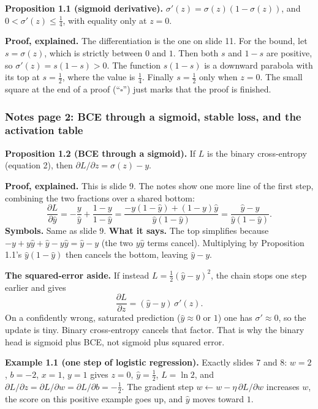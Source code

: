 \textbf{Proposition 1.1 (sigmoid derivative).} $\sigma'(z)=\sigma(z)(1-\sigma(z))$, and $0<\sigma'(z)\le\tfrac14$, with equality only at $z=0$.

\textbf{Proof, explained.} The differentiation is the one on slide 11. For the bound, let $s=\sigma(z)$, which is strictly between $0$ and $1$. Then both $s$ and $1-s$ are positive, so $\sigma'(z)=s(1-s)>0$. The function $s(1-s)$ is a downward parabola with its top at $s=\tfrac12$, where the value is $\tfrac14$. Finally $s=\tfrac12$ only when $z=0$. The small square at the end of a proof (``$\square$'') just marks that the proof is finished.

\subsubsection{Notes page 2: BCE through a sigmoid, stable loss, and the activation table}

\textbf{Proposition 1.2 (BCE through a sigmoid).} If $L$ is the binary cross-entropy (equation 2), then $\partial L/\partial z=\sigma(z)-y$.

\textbf{Proof, explained.} This is slide 9. The notes show one more line of the first step, combining the two fractions over a shared bottom:
\[
\frac{\partial L}{\partial\hat{y}}=-\frac{y}{\hat{y}}+\frac{1-y}{1-\hat{y}}=\frac{-y(1-\hat{y})+(1-y)\hat{y}}{\hat{y}(1-\hat{y})}=\frac{\hat{y}-y}{\hat{y}(1-\hat{y})}.
\]
\textbf{Symbols.} Same as slide 9. \textbf{What it says.} The top simplifies because $-y+y\hat{y}+\hat{y}-y\hat{y}=\hat{y}-y$ (the two $y\hat{y}$ terms cancel). Multiplying by Proposition 1.1's $\hat{y}(1-\hat{y})$ then cancels the bottom, leaving $\hat{y}-y$.

\textbf{The squared-error aside.} If instead $L=\tfrac12(\hat{y}-y)^2$, the chain stops one step earlier and gives
\[
\frac{\partial L}{\partial z}=(\hat{y}-y)\,\sigma'(z).
\]
On a confidently wrong, saturated prediction ($\hat{y}\approx0$ or $1$) one has $\sigma'\approx0$, so the update is tiny. Binary cross-entropy cancels that factor. That is why the binary head is sigmoid plus BCE, not sigmoid plus squared error.

\textbf{Example 1.1 (one step of logistic regression).} Exactly slides 7 and 8: $w=2$, $b=-2$, $x=1$, $y=1$ gives $z=0$, $\hat{y}=\tfrac12$, $L=\ln2$, and $\partial L/\partial z=\partial L/\partial w=\partial L/\partial b=-\tfrac12$. The gradient step $w\leftarrow w-\eta\,\partial L/\partial w$ increases $w$, the score on this positive example goes up, and $\hat{y}$ moves toward $1$.

